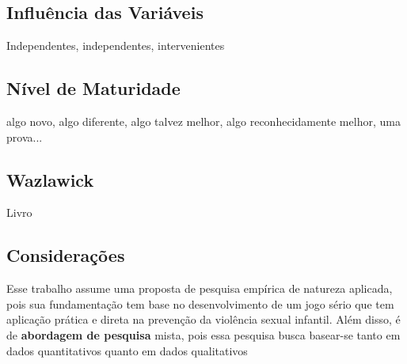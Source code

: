 \subsection{Influência das Variáveis}\label{sub:variaveis}
Independentes, independentes, intervenientes

\subsection{Nível de Maturidade}\label{sub:maturidade}
algo novo, algo diferente, algo talvez melhor, algo reconhecidamente melhor, uma prova...

\subsection{Wazlawick}\label{sub:Wazlawick}
Livro




\subsection{Considerações}\label{sub:considerar}



Esse trabalho assume uma proposta de pesquisa empírica de natureza aplicada, pois sua fundamentação tem base no desenvolvimento de um jogo sério que tem aplicação prática e direta na prevenção da violência sexual infantil. Além disso, é de \textbf{abordagem de pesquisa} mista, pois essa pesquisa busca basear-se tanto em dados quantitativos quanto em dados qualitativos %

